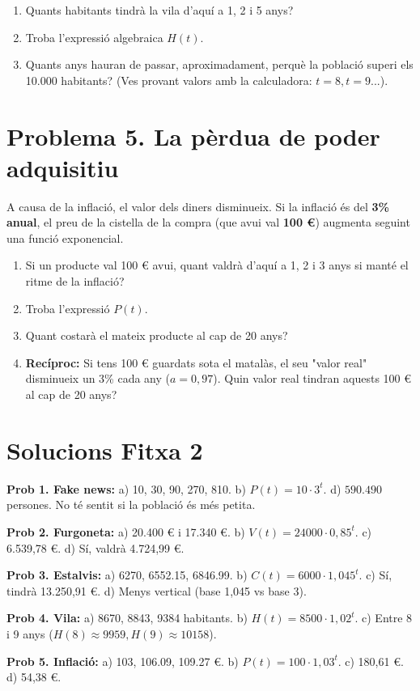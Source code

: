 \documentclass[12pt,a4paper]{article}
\begin{document}
\begin{enumerate}[label=\alph*)]
    \item Quants habitants tindrà la vila d'aquí a 1, 2 i 5 anys?
    \item Troba l'expressió algebraica $H(t)$.
    \item Quants anys hauran de passar, aproximadament, perquè la població superi els 10.000 habitants? (Ves provant valors amb la calculadora: $t=8, t=9...$).
\end{enumerate}

\section*{Problema 5. La pèrdua de poder adquisitiu}
A causa de la inflació, el valor dels diners disminueix. Si la inflació és del \textbf{3\% anual}, el preu de la cistella de la compra (que avui val \textbf{100 \euro}) augmenta seguint una funció exponencial.

\begin{enumerate}[label=\alph*)]
    \item Si un producte val 100 \euro{} avui, quant valdrà d'aquí a 1, 2 i 3 anys si manté el ritme de la inflació?
    \item Troba l'expressió $P(t)$.
    \item Quant costarà el mateix producte al cap de 20 anys?
    \item \textbf{Recíproc:} Si tens 100 \euro{} guardats sota el matalàs, el seu "valor real" disminueix un 3\% cada any ($a=0,97$). Quin valor real tindran aquests 100 \euro{} al cap de 20 anys?
\end{enumerate}

\newpage

\section*{Solucions Fitxa 2}

\textbf{Prob 1. Fake news:} 
a) 10, 30, 90, 270, 810. b) $P(t) = 10 \cdot 3^t$. d) $590.490$ persones. No té sentit si la població és més petita.

\textbf{Prob 2. Furgoneta:} 
a) 20.400 \euro{} i 17.340 \euro. b) $V(t) = 24000 \cdot 0,85^t$. c) 6.539,78 \euro. d) Sí, valdrà 4.724,99 \euro.

\textbf{Prob 3. Estalvis:} 
a) 6270, 6552.15, 6846.99. b) $C(t) = 6000 \cdot 1,045^t$. c) Sí, tindrà 13.250,91 \euro. d) Menys vertical (base 1,045 vs base 3).

\textbf{Prob 4. Vila:} 
a) 8670, 8843, 9384 habitants. b) $H(t) = 8500 \cdot 1,02^t$. c) Entre 8 i 9 anys ($H(8) \approx 9959, H(9) \approx 10158$).

\textbf{Prob 5. Inflació:} 
a) 103, 106.09, 109.27 \euro. b) $P(t) = 100 \cdot 1,03^t$. c) 180,61 \euro. d) 54,38 \euro.
\end{document}
